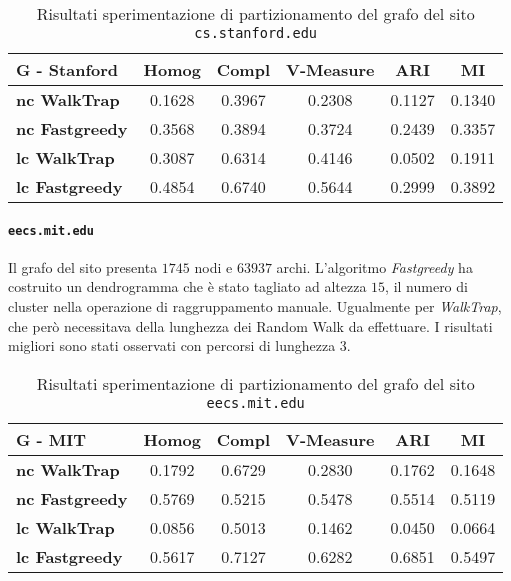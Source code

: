 \begin{table}[H]
	\begin{tabular}{| l | c | c | c | c | c |}
	\hline
	\textbf{G - Stanford}  & \textbf{Homog} & \textbf{Compl} & \textbf{V-Measure}  & \textbf{ARI}  & \textbf{MI} \\ [3ex] 
	\hline
	\textbf{nc WalkTrap} & 0.1628 & 0.3967 & 0.2308 & 0.1127 & 0.1340 \\[3ex]
	 \hline
	\textbf{nc Fastgreedy} & 0.3568 & 0.3894 & 0.3724 & 0.2439 & 0.3357 \\[3ex]
	 \hline	
	\textbf{lc WalkTrap} & 0.3087 & 0.6314 & 0.4146 & 0.0502 & 0.1911 \\[3ex]
	 \hline	
	\textbf{lc Fastgreedy} & 0.4854 & 0.6740 & 0.5644 & 0.2999 & 0.3892\\ [3ex]
	\hline
	\end{tabular}
	\caption{Risultati sperimentazione di partizionamento del grafo del sito \texttt{cs.stanford.edu}}
	\label{metricheGraphStanf}
\end{table}
 
\paragraph{\texttt{eecs.mit.edu}} Il grafo del sito presenta $1745$ nodi e $63937$ archi. L'algoritmo \textit{Fastgreedy} ha costruito un dendrogramma che è stato tagliato ad altezza $15$, il numero di cluster nella operazione di raggruppamento manuale. Ugualmente per \textit{WalkTrap}, che però necessitava della lunghezza dei Random Walk da effettuare. I risultati migliori sono stati osservati con percorsi di lunghezza $3$.

\begin{table}[H]
	\begin{tabular}{| l | c | c | c | c | c |}
	\hline
	\textbf{G - MIT}  & \textbf{Homog} & \textbf{Compl} & \textbf{V-Measure}  & \textbf{ARI}  & \textbf{MI} \\ [3ex] \hline
	\textbf{nc WalkTrap} & 0.1792 & 0.6729 & 0.2830 & 0.1762 & 0.1648\\ [3ex]
	 \hline
	\textbf{nc Fastgreedy} & 0.5769 & 0.5215 & 0.5478 & 0.5514 & 0.5119\\ [3ex]
	 \hline	
	\textbf{lc WalkTrap} & 0.0856 & 0.5013 & 0.1462 & 0.0450 & 0.0664\\ [3ex]
	 \hline	
	\textbf{lc Fastgreedy} & 0.5617 & 0.7127 & 0.6282 & 0.6851 & 0.5497\\ [3ex]
	\hline
	\end{tabular}
	\caption{Risultati sperimentazione di partizionamento del grafo del sito \texttt{eecs.mit.edu}}
	\label{metricheGraphMit}
\end{table}

